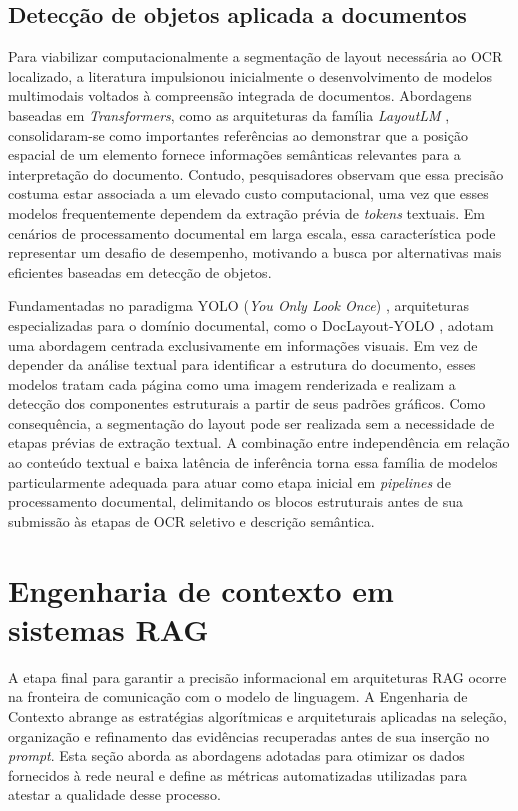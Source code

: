 \subsection{Detecção de objetos aplicada a documentos}
\label{subsec:yolo_documentos}

Para viabilizar computacionalmente a segmentação de layout necessária ao OCR localizado, a literatura impulsionou inicialmente o desenvolvimento de modelos multimodais voltados à compreensão integrada de documentos. Abordagens baseadas em \textit{Transformers}, como as arquiteturas da família \textit{LayoutLM} , consolidaram-se como importantes referências ao demonstrar que a posição espacial de um elemento fornece informações semânticas relevantes para a interpretação do documento. Contudo, pesquisadores observam que essa precisão costuma estar associada a um elevado custo computacional, uma vez que esses modelos frequentemente dependem da extração prévia de \textit{tokens} textuais. Em cenários de processamento documental em larga escala, essa característica pode representar um desafio de desempenho, motivando a busca por alternativas mais eficientes baseadas em detecção de objetos.

Fundamentadas no paradigma YOLO (\textit{You Only Look Once}) , arquiteturas especializadas para o domínio documental, como o DocLayout-YOLO , adotam uma abordagem centrada exclusivamente em informações visuais. Em vez de depender da análise textual para identificar a estrutura do documento, esses modelos tratam cada página como uma imagem renderizada e realizam a detecção dos componentes estruturais a partir de seus padrões gráficos. Como consequência, a segmentação do layout pode ser realizada sem a necessidade de etapas prévias de extração textual. A combinação entre independência em relação ao conteúdo textual e baixa latência de inferência torna essa família de modelos particularmente adequada para atuar como etapa inicial em \textit{pipelines} de processamento documental, delimitando os blocos estruturais antes de sua submissão às etapas de OCR seletivo e descrição semântica.


\section{Engenharia de contexto em sistemas RAG}
\label{sec:engenharia_contexto}

A etapa final para garantir a precisão informacional em arquiteturas RAG ocorre na fronteira de comunicação com o modelo de linguagem. A Engenharia de Contexto abrange as estratégias algorítmicas e arquiteturais aplicadas na seleção, organização e refinamento das evidências recuperadas antes de sua inserção no \textit{prompt}. Esta seção aborda as abordagens adotadas para otimizar os dados fornecidos à rede neural e define as métricas automatizadas utilizadas para atestar a qualidade desse processo.

